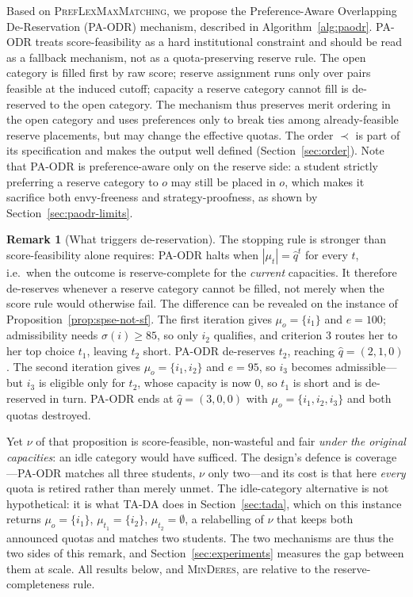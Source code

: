 \documentclass[a4paper,twoside]{article}
\theoremstyle{definition}
\newtheorem{nremark}{Remark}
\begin{document}
Based on \textsc{PrefLexMaxMatching}, we propose the Preference-Aware Overlapping De-Reservation (PA-ODR) mechanism, described in Algorithm~\ref{alg:paodr}. PA-ODR treats score-feasibility as a hard institutional constraint and should be read as a fallback mechanism, not as a quota-preserving reserve rule. The open category is filled first by raw score; reserve assignment runs only over pairs feasible at the induced cutoff; capacity a reserve category cannot fill is de-reserved to the open category. The mechanism thus preserves merit ordering in the open category and uses preferences only to break ties among already-feasible reserve placements, but may change the effective quotas. The order $\prec$ is part of its specification and makes the output well defined (Section~\ref{sec:order}). Note that PA-ODR is preference-aware only on the reserve side: a student strictly preferring a reserve category to $o$ may still be placed in $o$, which makes it sacrifice both envy-freeness and strategy-proofness, as shown by Section~\ref{sec:paodr-limits}.

\begin{nremark}[What triggers de-reservation]
\label{sec:trigger}
The stopping rule is stronger than score-feasibility alone requires: PA-ODR halts when $|\mu_t|=\hat q^t$ for every $t$, i.e.\ when the outcome is reserve-complete for the \emph{current} capacities. It therefore de-reserves whenever a reserve category cannot be filled, not merely when the score rule would otherwise fail. The difference can be revealed on the instance of Proposition~\ref{prop:spse-not-sf}. The first iteration gives $\mu_o=\{i_1\}$ and $e=100$; admissibility needs $\sigma(i)\ge85$, so only $i_2$ qualifies, and criterion 3 routes her to her top choice $t_1$, leaving $t_2$ short. PA-ODR de-reserves $t_2$, reaching $\hat q=(2,1,0)$. The second iteration gives $\mu_o=\{i_1,i_2\}$ and $e=95$, so $i_3$ becomes admissible---but $i_3$ is eligible only for $t_2$, whose capacity is now $0$, so $t_1$ is short and is de-reserved in turn. PA-ODR ends at $\hat q=(3,0,0)$ with $\mu_o=\{i_1,i_2,i_3\}$ and both quotas destroyed.

Yet $\nu$ of that proposition is score-feasible, non-wasteful and fair \emph{under the original capacities}: an idle category would have sufficed. The design's defence is coverage---PA-ODR matches all three students, $\nu$ only two---and its cost is that here \emph{every} quota is retired rather than merely unmet. The idle-category alternative is not hypothetical: it is what TA-DA does in Section~\ref{sec:tada}, which on this instance returns $\mu_o=\{i_1\}$, $\mu_{t_1}=\{i_2\}$, $\mu_{t_2}=\emptyset$, a relabelling of $\nu$ that keeps both announced quotas and matches two students. The two mechanisms are thus the two sides of this remark, and Section~\ref{sec:experiments} measures the gap between them at scale. All results below, and \textsc{MinDeres}, are relative to the reserve-completeness rule.
\end{nremark}
\end{document}
